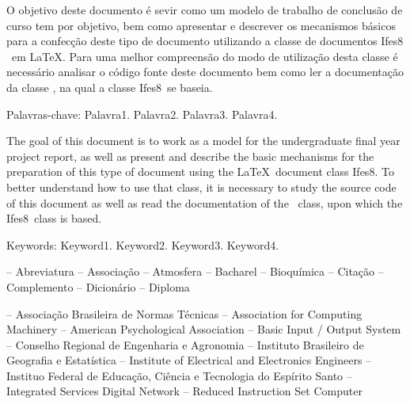 \documentclass[times,english,brazil,oneside,section=TITLE]{ifes8}
\newcommand{\ifestex}{\textsf{Ifes$8$}}
\begin{document}
\begin{resumo}
  O objetivo deste documento é sevir como um modelo de trabalho de
  conclusão de curso tem por objetivo, bem como apresentar e descrever
  os mecanismos básicos para a confecção deste tipo de documento
  utilizando a classe de documentos \ifestex\ em \LaTeX.
  Para uma melhor compreensão do modo de utilização desta classe é
  necessário analisar o código fonte deste documento bem como ler a
  documentação da classe \abnTeX, na qual a classe \ifestex\ se
  baseia.

  Palavras-chave: Palavra1. Palavra2. Palavra3. Palavra4.
\end{resumo}

\begin{resumo}[Abstract]
  \begin{otherlanguage}{english}
    The goal of this document is to work as a model for the
    undergraduate final year project report, as well as present and
    describe the basic mechanisms for the preparation of this type of
    document using the \LaTeX\ document class \ifestex.
    To better understand how to use that class, it is necessary to
    study the source code of this document as well as read the
    documentation of the \abnTeX\ class, upon which the \ifestex\
    class is based.

    Keywords: Keyword1. Keyword2. Keyword3. Keyword4.
  \end{otherlanguage}
\end{resumo}


\renewcommand{\listfigurename}{Lista de figuras}
\pdfbookmark[0]{\listfigurename}{lof}
\listoffigures*
\cleardoublepage


\listoftables*
\cleardoublepage


\listadequadros*
\cleardoublepage


\begin{abreviaturas}
   -- Abreviatura
   -- Associação
   -- Atmosfera
   -- Bacharel
   -- Bioquímica
   -- Citação
   -- Complemento
   -- Dicionário
   -- Diploma
\end{abreviaturas}


\begin{siglas}
   -- Associação Brasileira de Normas Técnicas
   -- Association for Computing Machinery
   -- American Psychological Association
   -- Basic Input / Output System
   -- Conselho Regional de Engenharia e Agronomia
   -- Instituto Brasileiro de Geografia e Estatística
  \simb{IEEE} -- Institute of Electrical and Electronics Engineers
  \simb{Ifes} -- Instituo Federal de Educação, Ciência e Tecnologia do Espírito Santo
  \simb{ISDN} -- Integrated Services Digital Network
   -- Reduced Instruction Set Computer
\end{siglas}
\end{document}
